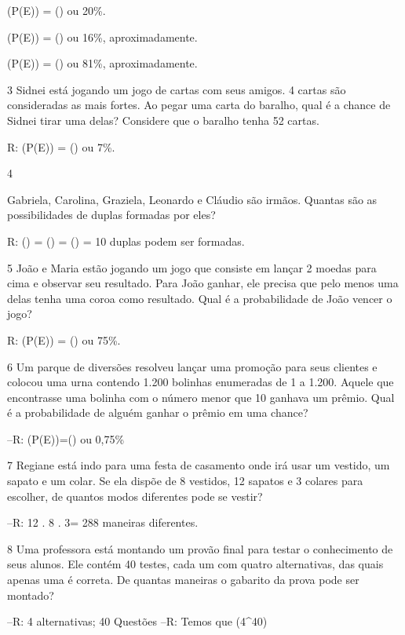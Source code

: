 {(P(E)) = () ou 20\%.
\item

(P(E)) = () ou 16\%, aproximadamente.
\item

(P(E)) = () ou 81\%,
aproximadamente.

\num{3} Sidnei está jogando um jogo de cartas com seus amigos. 4 cartas são
consideradas as mais fortes. Ao pegar uma carta do baralho, qual é a
chance de Sidnei tirar uma delas? Considere que o baralho tenha 52
cartas.

R: (P(E)) = () ou 7\%.

\num{4}

Gabriela, Carolina, Graziela, Leonardo e Cláudio são irmãos. Quantas são
as possibilidades de duplas formadas por eles?

R: () = () = () = 10
duplas podem ser formadas.

\num{5} João e Maria estão jogando um jogo que consiste em lançar 2 moedas
para cima e observar seu resultado. Para João ganhar, ele precisa que
pelo menos uma delas tenha uma coroa como resultado. Qual é a
probabilidade de João vencer o jogo?

R: (P(E)) = () ou 75\%.

\num{6} Um parque de diversões resolveu lançar uma promoção para seus
clientes e colocou uma urna contendo 1.200 bolinhas enumeradas de 1 a
1.200. Aquele que encontrasse uma bolinha com o número menor que 10
ganhava um prêmio. Qual é a probabilidade de alguém ganhar o prêmio em
uma chance?

--R: (P(E))=() ou 0,75\%

\num{7} Regiane está indo para uma festa de casamento onde irá usar um
vestido, um sapato e um colar. Se ela dispõe de 8 vestidos, 12 sapatos e
3 colares para escolher, de quantos modos diferentes pode se vestir?

--R: 12 . 8 . 3= 288 maneiras diferentes.

\num{8} Uma professora está montando um provão final para testar o
conhecimento de seus alunos. Ele contém 40 testes, cada um com quatro
alternativas, das quais apenas uma é correta. De quantas maneiras o
gabarito da prova pode ser montado?

--R: 4 alternativas; 40 Questões
--R: Temos que (4^{40})

}
